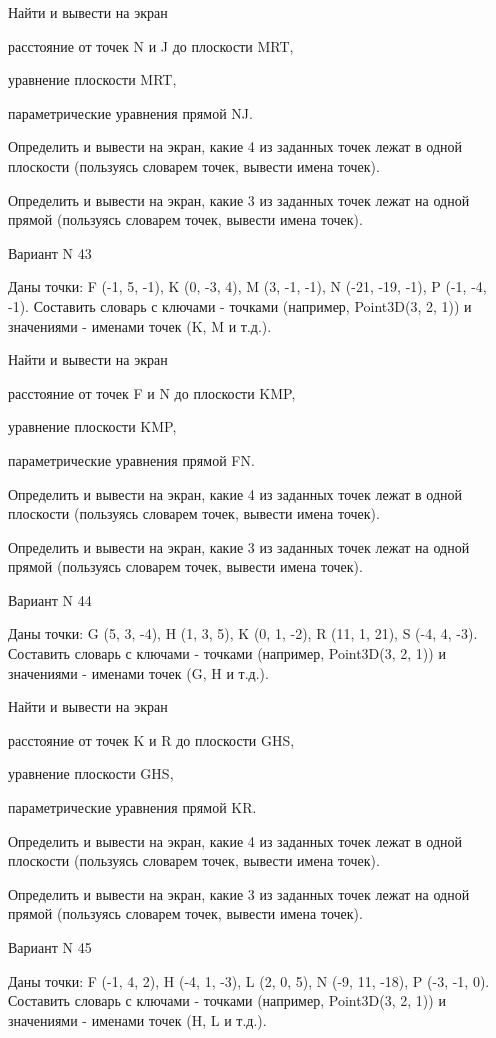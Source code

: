 \documentclass[11pt]{report}
\begin{document}
 
Найти и вывести на экран


расстояние от точек N и J до плоскости MRT,

 
уравнение плоскости MRT,

 
параметрические уравнения прямой NJ.


Определить и вывести на экран, какие 4 из заданных точек лежат в одной плоскости (пользуясь словарем точек, вывести имена точек).


Определить и вывести на экран, какие 3 из заданных точек лежат на одной прямой (пользуясь словарем точек, вывести имена точек).

Вариант N 43

Даны точки: F (-1, 5, -1), K (0, -3, 4), M (3, -1, -1), N (-21, -19, -1), P (-1, -4, -1).
Составить словарь с ключами - точками (например, Point3D(3, 2, 1)) и значениями - именами точек (K, M и т.д.).

 
Найти и вывести на экран


расстояние от точек F и N до плоскости KMP,

 
уравнение плоскости KMP,

 
параметрические уравнения прямой FN.


Определить и вывести на экран, какие 4 из заданных точек лежат в одной плоскости (пользуясь словарем точек, вывести имена точек).


Определить и вывести на экран, какие 3 из заданных точек лежат на одной прямой (пользуясь словарем точек, вывести имена точек).

Вариант N 44

Даны точки: G (5, 3, -4), H (1, 3, 5), K (0, 1, -2), R (11, 1, 21), S (-4, 4, -3).
Составить словарь с ключами - точками (например, Point3D(3, 2, 1)) и значениями - именами точек (G, H и т.д.).

 
Найти и вывести на экран


расстояние от точек K и R до плоскости GHS,

 
уравнение плоскости GHS,

 
параметрические уравнения прямой KR.


Определить и вывести на экран, какие 4 из заданных точек лежат в одной плоскости (пользуясь словарем точек, вывести имена точек).


Определить и вывести на экран, какие 3 из заданных точек лежат на одной прямой (пользуясь словарем точек, вывести имена точек).

Вариант N 45

Даны точки: F (-1, 4, 2), H (-4, 1, -3), L (2, 0, 5), N (-9, 11, -18), P (-3, -1, 0).
Составить словарь с ключами - точками (например, Point3D(3, 2, 1)) и значениями - именами точек (H, L и т.д.).
\end{document}
